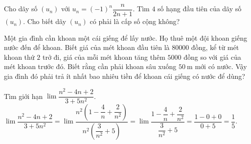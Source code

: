\begin{bt}%
	Cho dãy số $\left(u_n\right)$ với $u_n=(-1)^n \dfrac{n}{2 n+1}$. Tìm $4$ số hạng đầu tiên của dãy số $\left(u_n\right)$. Cho biết dãy $\left(u_n\right)$ có phải là cấp số cộng không?
\end{bt}

\begin{bt}%
	Một gia đình cần khoan một cái giếng để lấy nước. Họ thuê một đội khoan giếng nước đến để khoan. Biết giá của mét khoan đầu tiên là $80000$ đồng, kể từ mét khoan thứ $2$ trở đi, giá của mỗi mét khoan tăng thêm $5000$ đồng so với giá của mét khoan trước đó. Biết rằng cần phải khoan sâu xuống $50 \mathrm{~m}$ mới có nước. Vậy gia đình đó phải trả ít nhất bao nhiêu tiền để khoan cái giếng có nước để dùng?
\end{bt}

\begin{bt}%

	Tìm giới hạn $\lim\dfrac{n^2-4n+2}{3+5n^2}$.
	\loigiai
	{
		$\lim\dfrac{n^2-4n+2}{3+5n^2}=\lim\dfrac{n^2\left(1-\dfrac{4}{n}+\dfrac{2}{n^2}\right)}{n^2\left(\dfrac{3}{n^2}+5\right)}=\lim\dfrac{1-\dfrac{4}{n}+\dfrac{2}{n^2}}{\dfrac{3}{n^2}+5}=\dfrac{1-0+0}{0+5}=\dfrac{1}{5}$.
	}
\end{bt}

